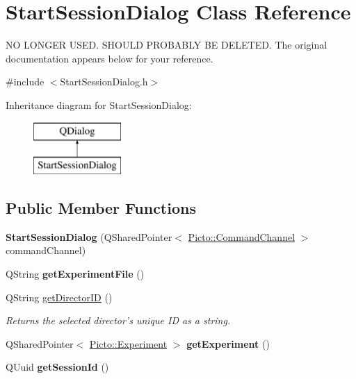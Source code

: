 \hypertarget{class_start_session_dialog}{\section{Start\-Session\-Dialog Class Reference}
\label{class_start_session_dialog}
}


N\-O L\-O\-N\-G\-E\-R U\-S\-E\-D. S\-H\-O\-U\-L\-D P\-R\-O\-B\-A\-B\-L\-Y B\-E D\-E\-L\-E\-T\-E\-D. The original documentation appears below for your reference.  




{\ttfamily \#include $<$Start\-Session\-Dialog.\-h$>$}

Inheritance diagram for Start\-Session\-Dialog\-:\begin{figure}[H]
\begin{center}
\leavevmode
\includegraphics[height=2.000000cm]{class_start_session_dialog}
\end{center}
\end{figure}
\subsection*{Public Member Functions}
\begin{DoxyCompactItemize}
\item 
\hypertarget{class_start_session_dialog_a1600c6d47c688c82c427d1a384d98a18}{{\bfseries Start\-Session\-Dialog} (Q\-Shared\-Pointer$<$ \hyperlink{class_picto_1_1_command_channel}{Picto\-::\-Command\-Channel} $>$ command\-Channel)}\label{class_start_session_dialog_a1600c6d47c688c82c427d1a384d98a18}

\item 
\hypertarget{class_start_session_dialog_ab7beaec7de299a0d39d59ed8ccdc056d}{Q\-String {\bfseries get\-Experiment\-File} ()}\label{class_start_session_dialog_ab7beaec7de299a0d39d59ed8ccdc056d}

\item 
Q\-String \hyperlink{class_start_session_dialog_a06f3481b80116c64704c71b544e28bd2}{get\-Director\-I\-D} ()
\begin{DoxyCompactList}\small\item\em Returns the selected director's unique I\-D as a string. \end{DoxyCompactList}\item 
\hypertarget{class_start_session_dialog_ac915f908eb6acf959f005785d70906b7}{Q\-Shared\-Pointer$<$ \hyperlink{class_picto_1_1_experiment}{Picto\-::\-Experiment} $>$ {\bfseries get\-Experiment} ()}\label{class_start_session_dialog_ac915f908eb6acf959f005785d70906b7}

\item 
\hypertarget{class_start_session_dialog_a3df5c064883f713ba8b5796b0a15d7f3}{Q\-Uuid {\bfseries get\-Session\-Id} ()}\label{class_start_session_dialog_a3df5c064883f713ba8b5796b0a15d7f3}

\end{DoxyCompactItemize}


